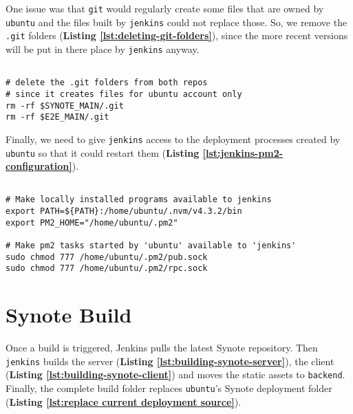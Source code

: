 One issue was that \texttt{git} would regularly create some files that are owned by \texttt{ubuntu} and the files built by \texttt{jenkins} could not replace those. So, we remove the \texttt{.git} folders (\textbf{Listing \ref{lst:deleting-git-folders}}), since the more recent versions will be put in there place by \texttt{jenkins} anyway.

\begin{listing}[H]
\begin{verbatim}

# delete the .git folders from both repos
# since it creates files for ubuntu account only
rm -rf $SYNOTE_MAIN/.git
rm -rf $E2E_MAIN/.git

\end{verbatim}
\label{lst:deleting-git-folders}
\end{listing}

Finally, we need to give \texttt{jenkins} access to the deployment processes created by \texttt{ubuntu} so that it could restart them (\textbf{Listing \ref{lst:jenkins-pm2-configuration}}).

\begin{listing}[H]
\begin{verbatim}

# Make locally installed programs available to jenkins
export PATH=${PATH}:/home/ubuntu/.nvm/v4.3.2/bin
export PM2_HOME="/home/ubuntu/.pm2"

# Make pm2 tasks started by 'ubuntu' available to 'jenkins'
sudo chmod 777 /home/ubuntu/.pm2/pub.sock
sudo chmod 777 /home/ubuntu/.pm2/rpc.sock

\end{verbatim}
\label{lst:jenkins-pm2-configuration}
\end{listing}

\section{Synote Build}
\label{sec:synote-build}

Once a build is triggered, Jenkins pulls the latest Synote repository. Then \texttt{jenkins} builds the server (\textbf{Listing \ref{lst:building-synote-server}}), the client (\textbf{Listing \ref{lst:building-synote-client}}) and moves the static assets to \texttt{backend}. Finally, the complete build folder replaces \texttt{ubuntu}'s Synote deployment folder (\textbf{Listing \ref{lst:replace current deployment source}}).

